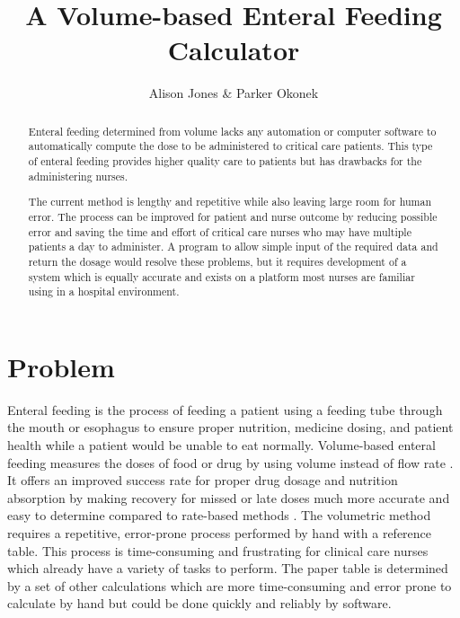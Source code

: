 \documentclass[10pt,draftclsnofoot,onecolumn]{IEEEtran}
\begin{document}
\title{A Volume-based Enteral Feeding Calculator}
\author{Alison Jones \& Parker Okonek}
\maketitle
\begin{abstract}
Enteral feeding determined from volume lacks any automation or computer software to
automatically compute the dose to be administered to critical care patients.
This type of enteral feeding provides higher quality care to patients but has drawbacks for
the administering nurses.

The current method is lengthy and repetitive while also leaving large room for human error.
The process can be improved for patient and nurse outcome by reducing possible error and 
saving the time and effort of critical care nurses who may have multiple patients a day to
administer. A program to allow simple input of the required data and return the dosage would
resolve these problems, but it requires development of a system which is equally accurate
and exists on a platform most nurses are familiar using in a hospital environment.
\end{abstract}
\newpage
\section{Problem}
Enteral feeding is the process of feeding a patient using a feeding tube through the 
mouth or esophagus to ensure proper nutrition, medicine dosing, and patient health while
a patient would be unable to eat normally. 
Volume-based enteral feeding measures the doses of food or drug by using volume instead of
flow rate . It offers an improved success rate for proper drug dosage
 and nutrition absorption  by making recovery for missed or late doses
 much more accurate and easy to determine compared to rate-based methods \autocite{whiteking}.
The volumetric method requires a repetitive, error-prone process performed by hand with
a reference table. This process is time-consuming and frustrating for clinical care nurses which
already have a variety of tasks to perform.  The paper table is determined by a set of other 
calculations which are more time-consuming and error prone to calculate by hand but could
be done quickly and reliably by software.
\end{document}
